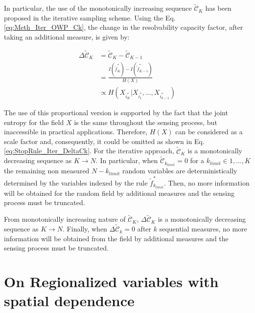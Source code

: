 In particular, the use of the monotonically increasing sequence $\mathcal{\tilde{C}}_{K}$ has been proposed in the iterative sampling scheme. Using the Eq. \eqref{eq:Meth_Iter_OWP_Ck}, the change in the resolvability capacity factor, after taking an additional measure, is given by:

\begin{align}\label{eq:StopRule_Iter_DeltaCk}
	\Delta \mathcal{\tilde{C}}_{K} & = \mathcal{\tilde{C}}_{K} - \mathcal{\tilde{C}}_{K-1} \\
																 & = \frac{I(\tilde{f}^{*}_{K})- I(\tilde{f}^{*}_{K-1})}{H(X)} \nonumber \\																 & \propto H(X_{ i^{*}_{K} }|X_{ i^{*}_{1} },\ldots,X_{ i^{*}_{k-1} }) \nonumber
\end{align}


The use of this proportional version is supported by the fact that the joint entropy for the field $X$ is the same throughout the sensing process, but inaccessible in practical applications. Therefore, $H(X)$ can be considered as a scale factor and, consequently, it could be omitted as shown in Eq. \eqref{eq:StopRule_Iter_DeltaCk}. For the iterative approach, $\mathcal{\tilde{C}}_{K}$ is a monotonically decreasing sequence as $K \rightarrow N$. In particular, when  $\mathcal{\tilde{C}}_{k_{limit}} = 0$ for a $k_{limit} \in {1, \ldots, K}$ the remaining non measured $N - k_{limit}$ random variables are deterministically determined by the variables indexed by the rule $\tilde{f}^{*}_{k_{limit}}$. Then, no more information will be obtained for the random field by additional measures and the sensing process must be truncated.

From monotonically increasing nature of $\mathcal{\tilde{C}}_{K}$,  $\Delta \mathcal{\tilde{C}}_{K}$ is a monotonically decreasing sequence as $K \rightarrow N$. Finally, when $\Delta \mathcal{\tilde{C}}_{k} = 0$ after $k$ sequential measures, no more information will be obtained from the field by additional measures and the sensing process must be truncated. 





\newpage
\section{On Regionalized variables with spatial dependence}
\label{sec_MI}

